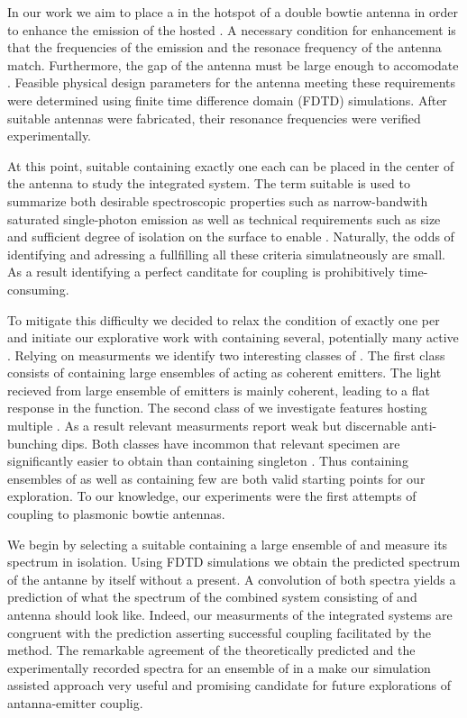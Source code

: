    In our work we aim to place a \nd in the hotspot of a double bowtie antenna in order to enhance the emission of the hosted \sivs. A necessary condition for enhancement is that the frequencies of the \siv emission and the resonace frequency of the antenna match. Furthermore, the gap of the antenna must be large enough to accomodate \nds. Feasible physical design parameters for the antenna meeting these requirements were determined using finite time difference domain (FDTD) simulations. After suitable antennas were fabricated, their resonance frequencies were verified experimentally.

   At this point, suitable \nds containing exactly one \siv each can be placed in the center of the antenna to study the integrated system. The term suitable is used to summarize both desirable spectroscopic properties such as narrow-bandwith saturated single-photon emission as well as technical requirements such as \nd size and sufficient degree of isolation on the surface to enable \pp. Naturally, the odds of identifying and adressing a \nd fullfilling all these criteria simulatneously are small. As a result identifying a perfect canditate for coupling is prohibitively time-consuming.

	 To mitigate this difficulty we decided to relax the condition of exactly one \siv per \nd and initiate our explorative work with \nds containing several, potentially many active \sivs. Relying on \gtz measurments we identify two interesting classes of \nds. The first class consists of \nds containing large ensembles of \sivs acting as coherent emitters. The \fl light recieved from large ensemble of emitters is mainly coherent, leading to a flat response in the \gtz function. The second class of \nds we investigate features \nds hosting multiple \sivs. As a result relevant \gtz measurments report weak but discernable anti-bunching dips. Both classes have incommon that relevant \nd specimen are significantly easier to obtain than \nds containing singleton \sivs. Thus \nds containing ensembles of \sivs as well as \nds containing few \sivs are both valid starting points for our exploration. To our knowledge, our experiments were the first attempts of coupling \sivs to plasmonic bowtie antennas.


   We begin by selecting a suitable \nd containing a large ensemble of \sivs and measure its spectrum in isolation. Using FDTD simulations we obtain the predicted spectrum of the antanne by itself without a \nd present. A convolution of both spectra yields a prediction of what the spectrum of the combined system consisting of \nd and antenna should look like. Indeed, our measurments of the integrated systems are congruent with the prediction asserting successful coupling facilitated by the \pp method. The remarkable agreement of the theoretically predicted and the experimentally recorded spectra for an ensemble of \sivs in a \nd make our simulation assisted approach very useful and promising candidate for future explorations of antanna-emitter couplig.

